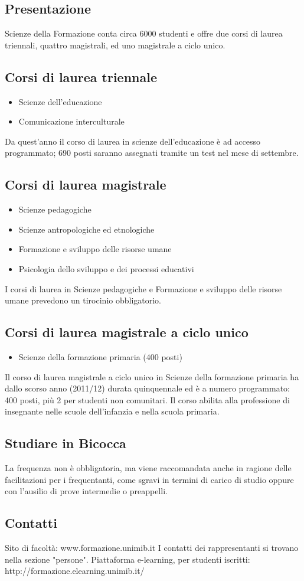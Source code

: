 \subsection{Presentazione}
Scienze della Formazione conta circa 6000 studenti e offre due corsi di laurea triennali, quattro magistrali, ed uno magistrale a ciclo unico. 
\subsection{Corsi di laurea triennale}

\begin{itemize}
\item Scienze dell'educazione 
\item Comunicazione interculturale
\end{itemize}
Da quest'anno il corso di laurea in scienze dell'educazione è ad accesso programmato; 690 posti saranno assegnati tramite un test nel mese di settembre. 
\subsection{Corsi di laurea magistrale}

\begin{itemize}
\item Scienze pedagogiche 
\item Scienze antropologiche ed etnologiche 
\item Formazione e sviluppo delle risorse umane 
\item Psicologia dello sviluppo e dei processi educativi 
\end{itemize}
I corsi di laurea  in Scienze pedagogiche e Formazione e sviluppo delle risorse umane prevedono un tirocinio obbligatorio. 
\subsection{Corsi di laurea magistrale a ciclo unico}
\begin{itemize}
\item Scienze della formazione primaria (400 posti) 
\end{itemize}
Il corso di laurea magistrale a ciclo unico in Scienze della formazione primaria ha dallo scorso anno (2011/12) durata quinquennale ed è a numero programmato: 400 posti, più 2 per studenti non comunitari. Il corso abilita alla professione di insegnante nelle scuole dell'infanzia e nella scuola primaria. 
\subsection{Studiare in Bicocca}
La frequenza non è obbligatoria, ma viene raccomandata anche in ragione delle facilitazioni per i frequentanti, come sgravi in termini di carico di studio oppure con l'ausilio di prove intermedie o preappelli. 
\subsection{Contatti}
Sito di facoltà: www.formazione.unimib.it 
I contatti dei rappresentanti si trovano nella sezione "persone". 
Piattaforma e-learning, per studenti iscritti: http://formazione.elearning.unimib.it/ 
